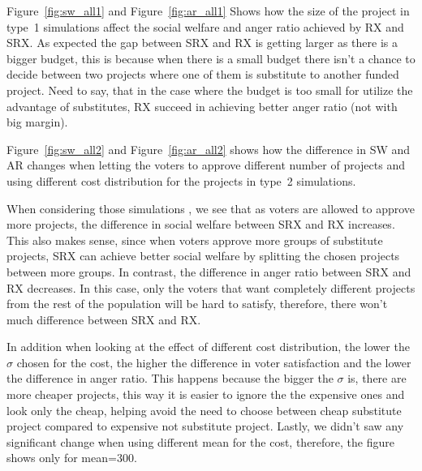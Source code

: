 \documentclass[runningheads]{llncs}
\begin{document}
\begin{subappendices}
Figure~\ref{fig:sw_all1} and Figure~\ref{fig:ar_all1} Shows how the size of the project in type~1 simulations affect the social welfare and anger ratio achieved by RX and SRX. As expected the gap between SRX and RX is getting larger as there is a bigger budget, this is because when there is a small budget there isn't a chance to decide between two projects where one of them is substitute to another funded project. Need to say, that in the case where the budget is too small for utilize the advantage of substitutes, RX succeed in achieving better anger ratio (not with big margin).

Figure~\ref{fig:sw_all2} and Figure~\ref{fig:ar_all2} shows how the difference in SW and AR changes when letting the voters to approve different number of projects and using different cost distribution for the projects in type~2 simulations.

When considering those   simulations , we   see that as  voters are allowed to approve more projects, the difference in social welfare between SRX and RX increases. This also makes sense, since when voters approve more groups of substitute projects, SRX can achieve better social welfare by splitting the chosen projects between more groups. In contrast, the difference in anger ratio between SRX and RX decreases. In this case, only the voters that want completely different projects from the rest of the population will be hard to satisfy, therefore, there won't much difference between SRX and RX.


In addition when looking at the effect of different cost distribution, the lower the $\sigma$ chosen for the cost, the higher the difference in voter satisfaction and the lower the difference in anger ratio. This happens because the bigger the $\sigma$ is, there are more cheaper projects, this way it is easier to ignore the the expensive ones and look only the cheap, helping avoid the need to choose between cheap substitute project compared to expensive not substitute project. Lastly, we didn't saw any significant change when using different mean for the cost, therefore, the figure shows only for mean=300.


\end{subappendices}
\end{document}
